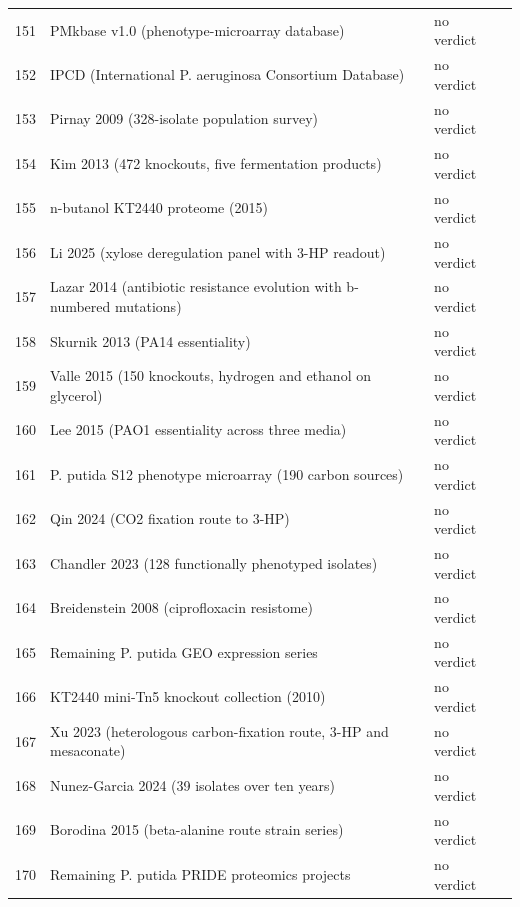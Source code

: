\begin{longtable}{@{}r L{76mm} L{20mm} L{36mm} L{24mm}@{}}
151 & PMkbase v1.0 (phenotype-microarray database) &  & no verdict &  \\
152 & IPCD (International P. aeruginosa Consortium Database) &  & no verdict &  \\
153 & Pirnay 2009 (328-isolate population survey) &  & no verdict &  \\
154 & Kim 2013 (472 knockouts, five fermentation products) &  & no verdict &  \\
155 & n-butanol KT2440 proteome (2015) &  & no verdict &  \\
156 & Li 2025 (xylose deregulation panel with 3-HP readout) &  & no verdict &  \\
157 & Lazar 2014 (antibiotic resistance evolution with b-numbered mutations) &  & no verdict &  \\
158 & Skurnik 2013 (PA14 essentiality) &  & no verdict &  \\
159 & Valle 2015 (150 knockouts, hydrogen and ethanol on glycerol) &  & no verdict &  \\
160 & Lee 2015 (PAO1 essentiality across three media) &  & no verdict &  \\
161 & P. putida S12 phenotype microarray (190 carbon sources) &  & no verdict &  \\
162 & Qin 2024 (CO2 fixation route to 3-HP) &  & no verdict &  \\
163 & Chandler 2023 (128 functionally phenotyped isolates) &  & no verdict &  \\
164 & Breidenstein 2008 (ciprofloxacin resistome) &  & no verdict &  \\
165 & Remaining P. putida GEO expression series &  & no verdict &  \\
166 & KT2440 mini-Tn5 knockout collection (2010) &  & no verdict &  \\
167 & Xu 2023 (heterologous carbon-fixation route, 3-HP and mesaconate) &  & no verdict &  \\
168 & Nunez-Garcia 2024 (39 isolates over ten years) &  & no verdict &  \\
169 & Borodina 2015 (beta-alanine route strain series) &  & no verdict &  \\
170 & Remaining P. putida PRIDE proteomics projects &  & no verdict &  \\

\end{longtable}
